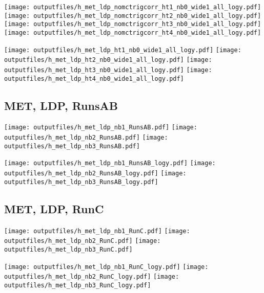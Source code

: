 \documentclass[11pt]{article}
\begin{document}
    \noindent
     \texttt{[image: outputfiles/h\_met\_ldp\_nomctrigcorr\_ht1\_nb0\_wide1\_all\_logy.pdf]}
     \texttt{[image: outputfiles/h\_met\_ldp\_nomctrigcorr\_ht2\_nb0\_wide1\_all\_logy.pdf]}
     \texttt{[image: outputfiles/h\_met\_ldp\_nomctrigcorr\_ht3\_nb0\_wide1\_all\_logy.pdf]}
     \texttt{[image: outputfiles/h\_met\_ldp\_nomctrigcorr\_ht4\_nb0\_wide1\_all\_logy.pdf]}

    \noindent
     \texttt{[image: outputfiles/h\_met\_ldp\_ht1\_nb0\_wide1\_all\_logy.pdf]}
     \texttt{[image: outputfiles/h\_met\_ldp\_ht2\_nb0\_wide1\_all\_logy.pdf]}
     \texttt{[image: outputfiles/h\_met\_ldp\_ht3\_nb0\_wide1\_all\_logy.pdf]}
     \texttt{[image: outputfiles/h\_met\_ldp\_ht4\_nb0\_wide1\_all\_logy.pdf]}

    \clearpage

    \subsection{ MET, LDP, RunsAB}

    \noindent
     \texttt{[image: outputfiles/h\_met\_ldp\_nb1\_RunsAB.pdf]}
     \texttt{[image: outputfiles/h\_met\_ldp\_nb2\_RunsAB.pdf]}
     \texttt{[image: outputfiles/h\_met\_ldp\_nb3\_RunsAB.pdf]}

    \noindent
     \texttt{[image: outputfiles/h\_met\_ldp\_nb1\_RunsAB\_logy.pdf]}
     \texttt{[image: outputfiles/h\_met\_ldp\_nb2\_RunsAB\_logy.pdf]}
     \texttt{[image: outputfiles/h\_met\_ldp\_nb3\_RunsAB\_logy.pdf]}


    \subsection{ MET, LDP, RunC}

    \noindent
     \texttt{[image: outputfiles/h\_met\_ldp\_nb1\_RunC.pdf]}
     \texttt{[image: outputfiles/h\_met\_ldp\_nb2\_RunC.pdf]}
     \texttt{[image: outputfiles/h\_met\_ldp\_nb3\_RunC.pdf]}

    \noindent
     \texttt{[image: outputfiles/h\_met\_ldp\_nb1\_RunC\_logy.pdf]}
     \texttt{[image: outputfiles/h\_met\_ldp\_nb2\_RunC\_logy.pdf]}
     \texttt{[image: outputfiles/h\_met\_ldp\_nb3\_RunC\_logy.pdf]}
\end{document}

